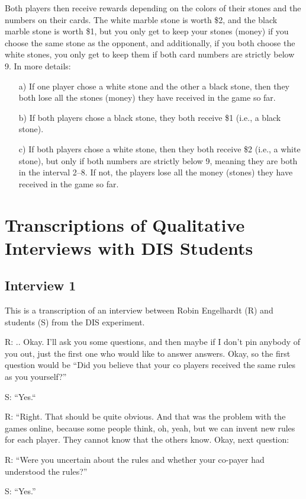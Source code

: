 \documentclass[a4paper,superscriptaddress,nofootinbib]{revtex4}
\begin{document}
Both players then receive rewards depending on the colors of their stones and the numbers on their cards. The white marble stone is worth \$2, and the black marble stone is worth \$1, but you only get to keep your stones (money) if you choose the same stone as the opponent, and additionally, if you both choose the white stones, you only get to keep them if both card numbers are strictly below 9. In more details:  
\begin{enumerate}
\item[a)] If one player chose a white stone and the other a black stone, then they both lose all the stones (money) they have received in the game so far.
\item[b)] If both players chose a black stone, they both receive \$1 (i.e., a black stone).
\item[c)] If both players chose a white stone, then they both receive \$2 (i.e., a white stone), but only if both numbers are strictly below 9, meaning they are both in the interval 2--8. If not, the players lose all the money (stones) they have received in the game so far.
\end{enumerate} 

\section*{Transcriptions of Qualitative Interviews with DIS Students}


\subsection*{Interview 1}
This is a transcription of an interview between Robin Engelhardt (R) and students (S) from the DIS experiment.


R: .. Okay. I'll ask you some questions, and then maybe if I don't pin anybody of you out, just the first one who would like to answer answers. Okay, so the first question would be 
“Did you believe that your co players received the same rules as you yourself?” 

S: “Yes.“

R: “Right. That should be quite obvious. And that was the problem with the games online, because some people think, oh, yeah, but we can invent new rules for each player. They cannot know that the others know. Okay, next question:

R: “Were you uncertain about the rules and whether your co-payer had understood the rules?” 

S: “Yes.”
\end{document}
